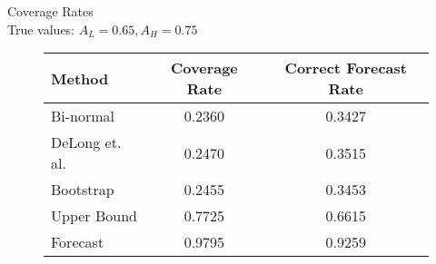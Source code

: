 


Coverage Rates \\
True values: $A_L = 0.65, A_H = 0.75$

\begin{figure}[h!]

\begin{center}


    \begin{tabular}{l c c }

    Method & Coverage Rate & Correct Forecast Rate \\

    \hline



          Bi-normal &  0.2360 & 0.3427 \\
     DeLong et. al. &  0.2470 & 0.3515 \\
          Bootstrap &  0.2455 & 0.3453 \\
        Upper Bound &  0.7725 & 0.6615 \\
           Forecast &  0.9795 & 0.9259 \\


    \hline

    \end{tabular}


\end{center}

%





\end{figure}



